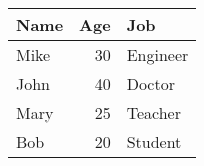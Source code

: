 \begin{tabular}{lrl}
\hline
 Name   &   Age & Job      \\
\hline
 Mike   &    30 & Engineer \\
 John   &    40 & Doctor   \\
 Mary   &    25 & Teacher  \\
 Bob    &    20 & Student  \\
\hline
\end{tabular}